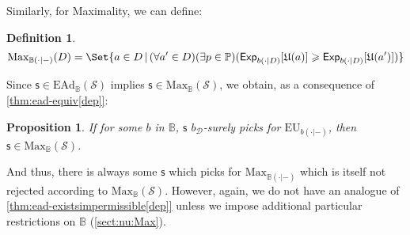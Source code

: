 \documentclass[a4paper]{article}
\newtheorem{definition}{Definition}
\newtheorem{proposition}[theorem]{Proposition}
\renewcommand\P{\mathbb{P}} %
\newcommand\Exp{\mathsf{Exp}}
\newcommand\EU{\mathrm{EU}}
\newcommand\EAd{\mathrm{EAd}}
\newcommand\U{\mathfrak{U}} %
\newcommand\Maximality{\mathrm{Max}}
\newcommand{\Decs}{\mathcal{D}}
\renewcommand\S{\mathcal{S}}
\newcommand\s{\mathsf{s}}
\newcommand{\IB}{\mathbb{B}}
\newcommand{\IP}{\P}
\newcommand{\Strategies}{\S}
\newcommand\SetDelimiter[1][]{
	\nonscript\,#1\vert \allowbreak \nonscript\,\mathopen{}}
\providecommand\given{\SetDelimiter}
\renewcommand{\geq}{\geqslant}
\newenvironment{CCM rewritten}
{\begingroup\color{blue}} %
{\endgroup}              %
\begin{document}
Similarly, for Maximality, we can define: 
\begin{definition}
	$$\Maximality_{\IB(\cdot|-)}(D) = \Set{a \in D \given (\forall a' \in D)(\exists p\in\IP)(\Exp_{b(\cdot|D)}[\U(a)]\geq\Exp_{b(\cdot|D)}[\U(a')])}
	$$\end{definition}
	Since $\s\in\EAd_\IB(\S)$ implies $\s\in\Maximality_\IB(\S)$, we obtain, as a consequence of \cref{thm:ead-equiv[dep]}:
	\begin{proposition}\label{thm:max-suff[dep]}
	If for some $b$ in $\IB$, $\s$ $b_\Decs$-surely picks for $\EU_{b(\cdot|-)}$, then $\s\in\Maximality_\IB(\Strategies)$. 
\end{proposition}And thus, there is always some $\s$ which picks for $\Maximality_{\IB(\cdot|-)}$ which is itself not rejected according to $\Maximality_\IB(\Strategies)$. However, again, we do not have %
an analogue of \cref{thm:ead-existsimpermissible[dep]} unless we impose additional particular restrictions on $\IB$ (\cref{sect:nu:Max}).
\end{document}
